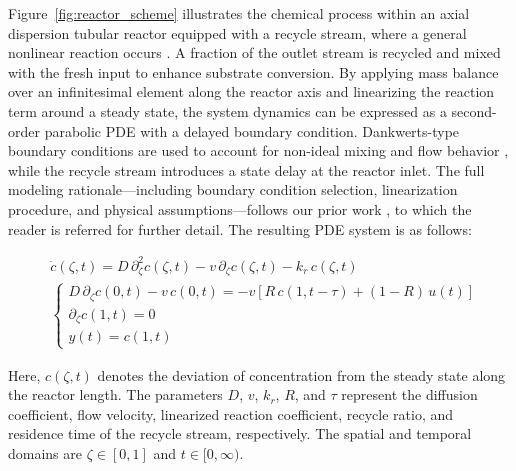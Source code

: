 Figure~\ref{fig:reactor_scheme} illustrates the chemical process within an axial dispersion tubular reactor equipped with a recycle stream, where a general nonlinear reaction occurs \cite{levenspiel1998chemical}. A fraction of the outlet stream is recycled and mixed with the fresh input to enhance substrate conversion. By applying mass balance over an infinitesimal element along the reactor axis and linearizing the reaction term around a steady state, the system dynamics can be expressed as a second-order parabolic PDE with a delayed boundary condition. Dankwerts-type boundary conditions are used to account for non-ideal mixing and flow behavior \cite{danckwerts1993continuous}, while the recycle stream introduces a state delay at the reactor inlet. The full modeling rationale—including boundary condition selection, linearization procedure, and physical assumptions—follows our prior work \cite{moadeli2025optimal}, to which the reader is referred for further detail. The resulting PDE system is as follows:

\begin{equation} \label{eq:PDE_original_model}
    \begin{aligned}
        &\dot{c}(\zeta, t) = D \, \partial^2_{\zeta} c(\zeta, t) - v \, \partial_{\zeta} c(\zeta, t) - k_r \, c(\zeta, t) \\
        &\begin{cases}
            D \, \partial_{\zeta} c(0, t) - v \, c(0, t) = -v \left[ R \, c(1, t - \tau) + (1 - R) \, u(t) \right] \\
            \partial_{\zeta} c(1, t) = 0 \\
            y(t) = c(1, t)
        \end{cases}
    \end{aligned}
\end{equation}

Here, $c(\zeta, t)$ denotes the deviation of concentration from the steady state along the reactor length. The parameters $D$, $v$, $k_r$, $R$, and $\tau$ represent the diffusion coefficient, flow velocity, linearized reaction coefficient, recycle ratio, and residence time of the recycle stream, respectively. The spatial and temporal domains are $\zeta \in [0, 1]$ and $t \in [0, \infty)$.


